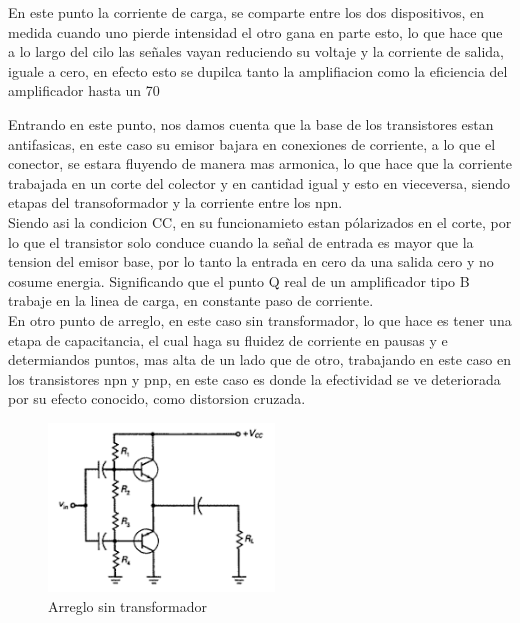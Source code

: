 \documentclass[12pt,a4paper]{article}
\begin{document}
En este punto la corriente de carga, se comparte entre los dos dispositivos, en medida cuando uno pierde intensidad el otro gana en parte esto, lo que hace que a lo largo del cilo las señales vayan reduciendo su voltaje y la corriente de salida, iguale a cero, en efecto esto se dupilca tanto la amplifiacion como la eficiencia del amplificador hasta un 70%

Entrando en este punto, nos damos cuenta que la base de los transistores estan antifasicas, en este caso su emisor bajara en conexiones de corriente, a lo que el conector, se estara fluyendo de manera mas armonica, lo que hace que la corriente trabajada en un corte del colector y en cantidad igual y esto en vieceversa, siendo etapas del transoformador y la corriente entre los npn.\\

Siendo asi la condicion CC, en su funcionamieto estan pólarizados en el corte, por lo que el transistor solo conduce cuando la señal de entrada es mayor que la tension del emisor base, por lo tanto la entrada en cero da una salida cero y no cosume energia. Significando que el punto Q real de un amplificador tipo B trabaje en la linea de carga, en constante paso de corriente.\\

En otro punto de arreglo, en este caso sin transformador, lo que hace es tener una etapa de capacitancia, el cual haga su fluidez de corriente en pausas y e determiandos puntos, mas alta de un lado que de otro, trabajando en este caso en los transistores npn y pnp, en este caso es donde la efectividad se ve deteriorada por su efecto conocido, como distorsion cruzada.\\

\begin{figure}[hbtp]
\centering
\includegraphics[width=6cm]{2.png}
\caption{Arreglo sin transformador}
\end{figure}
\end{document}
